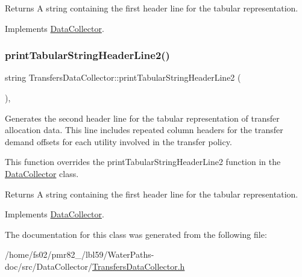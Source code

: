\begin{DoxyReturn}{Returns}
A string containing the first header line for the tabular representation. 
\end{DoxyReturn}


Implements \mbox{\hyperlink{classDataCollector_a91619cfa9e9b8cefd2f7c20d5718b41e}{Data\+Collector}}.

\mbox{\label{classTransfersDataCollector_ade6b896383f079d8973076e6b9a8053a}} 
\subsubsection{\texorpdfstring{print\+Tabular\+String\+Header\+Line2()}{printTabularStringHeaderLine2()}}
{\footnotesize\ttfamily string Transfers\+Data\+Collector\+::print\+Tabular\+String\+Header\+Line2 (\begin{DoxyParamCaption}{ }\end{DoxyParamCaption})\hspace{0.3cm}{\ttfamily [override]}, {\ttfamily [virtual]}}



Generates the second header line for the tabular representation of transfer allocation data. This line includes repeated column headers for the transfer demand offsets for each utility involved in the transfer policy. 

This function overrides the {\ttfamily print\+Tabular\+String\+Header\+Line2} function in the {\ttfamily \mbox{\hyperlink{classDataCollector}{Data\+Collector}}} class.

\begin{DoxyReturn}{Returns}
A string containing the first header line for the tabular representation. 
\end{DoxyReturn}


Implements \mbox{\hyperlink{classDataCollector_af01ea961314be2164f39e6d4cd59e443}{Data\+Collector}}.



The documentation for this class was generated from the following file\+:\begin{DoxyCompactItemize}
\item 
/home/fs02/pmr82\+\_/lbl59/\+Water\+Paths-\/doc/src/\+Data\+Collector/\mbox{\hyperlink{TransfersDataCollector_8h}{Transfers\+Data\+Collector.\+h}}\end{DoxyCompactItemize}
